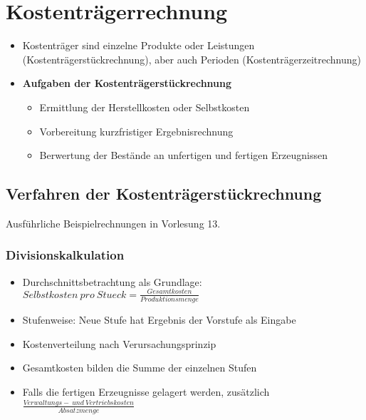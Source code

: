 \section{Kostenträgerrechnung}
\begin{itemize}
	\item Kostenträger sind einzelne Produkte oder Leistungen (Kostenträgerstückrechnung), aber auch Perioden (Kostenträgerzeitrechnung)
	\item \textbf{Aufgaben der Kostenträgerstückrechnung}
	\begin{itemize}
		\item Ermittlung der Herstellkosten oder Selbstkosten
		\item Vorbereitung kurzfristiger Ergebnisrechnung
		\item Berwertung der Bestände an unfertigen und fertigen Erzeugnissen
	\end{itemize}
\end{itemize}


\subsection{Verfahren der Kostenträgerstückrechnung}
Ausführliche Beispielrechnungen in Vorlesung 13.

\subsubsection{Divisionskalkulation}
\begin{itemize}
	\item Durchschnittsbetrachtung als Grundlage: \(Selbstkosten~pro~Stueck=\frac{Gesamtkosten}{Produktionsmenge}\)
	\item Stufenweise: Neue Stufe hat Ergebnis der Vorstufe als Eingabe
	\item Kostenverteilung nach Verursachungsprinzip
	\item Gesamtkosten bilden die Summe der einzelnen Stufen
	\item Falls die fertigen Erzeugnisse gelagert werden, zusätzlich \(\frac{Verwaltungs-~und~Vertriebskosten}{Absatzmenge}\)
\end{itemize}

